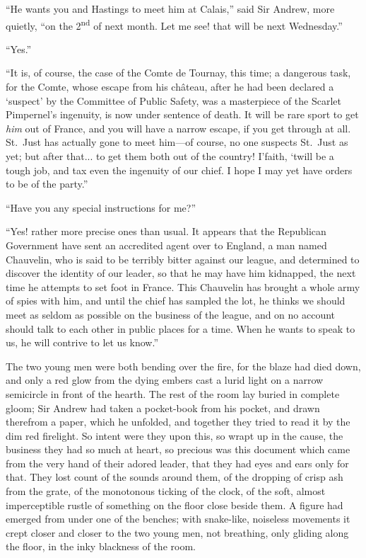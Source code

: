 \documentclass[paper=a5,BCOR=7mm,twoside,DIV=calc,12pt,usegeometry,chapterprefix,endperiod,headings=big]{scrbook}
\begin{document}
\enquote{He wants you and Hastings to meet him at Calais,} said Sir Andrew, more quietly, \enquote{on the 2\textsuperscript{nd} of next month. Let me see! that will be next Wednesday.}

\enquote{Yes.}

\enquote{It is, of course, the case of the Comte de Tournay, this time; a dangerous task, for the Comte, whose escape from his château, after he had been declared a \enquote{suspect} by the Committee of Public Safety, was a masterpiece of the Scarlet Pimpernel's ingenuity, is now under sentence of death. It will be rare sport to get \textit{him} out of France, and you will have a narrow escape, if you get through at all. St.~Just has actually gone to meet him---of course, no one suspects St.~Just as yet; but after that... to get them both out of the country! I'faith, `twill be a tough job, and tax even the ingenuity of our chief. I hope I may yet have orders to be of the party.}

\enquote{Have you any special instructions for me?}

\enquote{Yes! rather more precise ones than usual. It appears that the Republican Government have sent an accredited agent over to England, a man named Chauvelin, who is said to be terribly bitter against our league, and determined to discover the identity of our leader, so that he may have him kidnapped, the next time he attempts to set foot in France. This Chauvelin has brought a whole army of spies with him, and until the chief has sampled the lot, he thinks we should meet as seldom as possible on the business of the league, and on no account should talk to each other in public places for a time. When he wants to speak to us, he will contrive to let us know.}

The two young men were both bending over the fire, for the blaze had died down, and only a red glow from the dying embers cast a lurid light on a narrow semicircle in front of the hearth. The rest of the room lay buried in complete gloom; Sir Andrew had taken a pocket-book from his pocket, and drawn therefrom a paper, which he unfolded, and together they tried to read it by the dim red firelight. So intent were they upon this, so wrapt up in the cause, the business they had so much at heart, so precious was this document which came from the very hand of their adored leader, that they had eyes and ears only for that. They lost count of the sounds around them, of the dropping of crisp ash from the grate, of the monotonous ticking of the clock, of the soft, almost imperceptible rustle of something on the floor close beside them. A figure had emerged from under one of the benches; with snake-like, noiseless movements it crept closer and closer to the two young men, not breathing, only gliding along the floor, in the inky blackness of the room.
\end{document}

